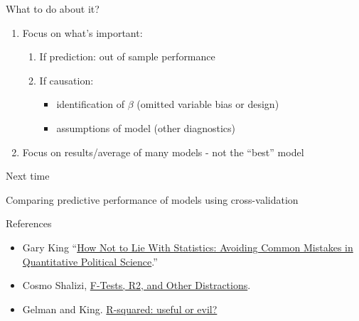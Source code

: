 \documentclass[ignorenonframetext,]{beamer}
\providecommand{\tightlist}{%
  \setlength{\itemsep}{0pt}\setlength{\parskip}{0pt}}
\begin{document}
\begin{frame}{What to do about it?}

\begin{enumerate}
\def\labelenumi{\arabic{enumi}.}
\tightlist
\item
  Focus on what's important:

  \begin{enumerate}
  \def\labelenumii{\arabic{enumii}.}
  \item
    If prediction: out of sample performance
  \item
    If causation:

    \begin{itemize}
    \tightlist
    \item
      identification of \(\beta\) (omitted variable bias or design)
    \item
      assumptions of model (other diagnostics)
    \end{itemize}
  \end{enumerate}
\item
  Focus on results/average of many models - not the ``best'' model
\end{enumerate}

\end{frame}

\begin{frame}{Next time}

Comparing predictive performance of models using cross-validation

\end{frame}

\begin{frame}{References}

\begin{itemize}
\tightlist
\item
  Gary King ``\href{http://gking.harvard.edu/files/mist.pdf}{How Not to
  Lie With Statistics: Avoiding Common Mistakes in Quantitative
  Political Science}.''
\item
  Cosmo Shalizi,
  \href{http://www.stat.cmu.edu/~cshalizi/mreg/15/lectures/10/lecture-10.pdf}{F-Tests,
  R2, and Other Distractions}.
\item
  Gelman and King.
  \href{http://andrewgelman.com/2007/08/29/rsquared_useful/}{R-squared:
  useful or evil?}
\end{itemize}

\end{frame}
\end{document}
